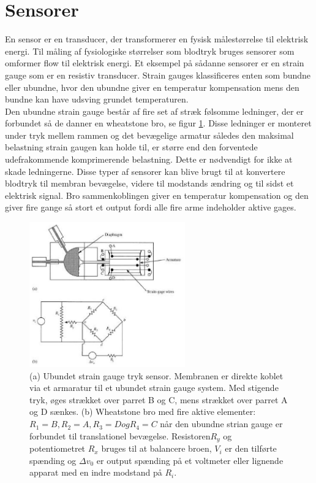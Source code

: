 \section{Sensorer}
En sensor er en transducer, der transformerer en fysisk målestørrelse til elektrisk energi. Til måling af fysiologiske størrelser som blodtryk bruges sensorer som omformer flow til elektrisk energi. Et eksempel på sådanne sensorer er en strain gauge som er en resistiv transducer. Strain gauges klassificeres enten som bundne eller ubundne, hvor den ubundne giver en temperatur kompensation mens den bundne kan have udsving grundet temperaturen.\\
Den ubundne strain gauge består af fire set af stræk følsomme ledninger, der er forbundet så de danner en wheatstone bro, se figur \ref{StrainGauge}. Disse ledninger er monteret under tryk mellem rammen og det bevægelige armatur således den maksimal belastning strain gaugen kan holde til, er større end den forventede udefrakommende komprimerende belastning. Dette er nødvendigt for ikke at skade ledningerne. Disse typer af sensorer kan blive brugt til at konvertere blodtryk til membran bevægelse, videre til modstands ændring og til sidst et elektrisk signal. Bro sammenkoblingen giver en temperatur kompensation og den giver fire gange så stort et output fordi alle fire arme indeholder aktive gages.\\
\begin{figure}[H]
	\centering
	\includegraphics[width=0.6\textwidth]{Figurer/Hardware/straingauge}
	\caption{(a) Ubundet strain gauge tryk sensor. Membranen er direkte koblet via et armaratur til et ubundet strain gauge system. Med stigende tryk, øges strækket over parret B og C, mens strækket over parret A og D sænkes. (b) Wheatstone bro med fire aktive elementer: $R_{1} = B, R_{2} = A, R_{3} = D og R_{4} = C $ når den ubundne strian gauge er forbundet til translationel bevægelse. Resistoren$ R_{y}$ og potentiometret $R_{x}$ bruges til at balancere broen, $V_{i}$ er den tilførte spænding og $\Delta v_{0}$ er output spænding på et voltmeter eller lignende apparat med en indre modstand på $R_{i}$. \protect\cite{blodtryk}}
	\label{StrainGauge}
\end{figure}









